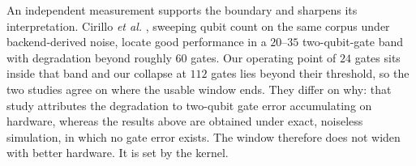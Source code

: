 \begin{revbody}
An independent measurement supports the boundary and sharpens its
interpretation. Cirillo \emph{et al.} \cite{qmi2026}, sweeping qubit count on
the same corpus under backend-derived noise, locate good performance in a
$20$--$35$ two-qubit-gate band with degradation beyond roughly $60$ gates. Our
operating point of $24$ gates sits inside that band and our collapse at $112$
gates lies beyond their threshold, so the two studies agree on where the
usable window ends. They differ on why: that study attributes the degradation
to two-qubit gate error accumulating on hardware, whereas the results above are
obtained under exact, noiseless simulation, in which no gate error exists. The
window therefore does not widen with better hardware. It is set by the kernel.
\end{revbody}
